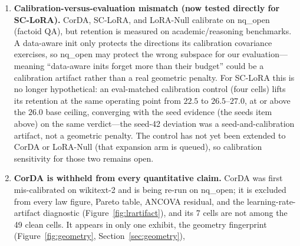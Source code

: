 \documentclass[11pt]{article}
\newcommand{\dw}{F_{\Delta}}
\begin{document}
\begin{enumerate}
        a plain-LoRA rank ladder at fixed lr\,3e-4 (r8${\to}$r16${\to}$r32)
        moves \emph{along} the curve rather than off it
        ($\dw\ 0.518\!\to\!0.603\!\to\!0.739$ with retention
        $24.0\!\to\!23.0\!\to\!22.2$): the rank effect vanishes once $\dw$ is
        controlled---rank buys magnitude, not retention. One disclosed anomaly:
        the rank-16 control's lr\,3e-4 sibling lands in a deterministic
        answer-format collapse basin---CS-8 $13.53$, below chance per-dataset,
        with retention fully \emph{intact} ($26.84$) and healthy training, and
        a dedicated re-evaluation reproduces it; it is not a magnitude effect
        ($\dw\!=\!0.328$), and its seed replicate is queued. The control is
        single-seed, and the weight-decay knob has still been given only to
        LoRA---so the remaining strong form of Claim~3 is the wd knob extended
        to every frontier arm.
  \item \textbf{Calibration-versus-evaluation mismatch (now tested directly for
        SC-LoRA).} CorDA, SC-LoRA, and LoRA-Null calibrate on nq\_open (factoid
        QA), but retention is measured on academic/reasoning benchmarks. A
        data-aware init only protects the directions its calibration covariance
        exercises, so nq\_open may protect the wrong subspace for our
        evaluation---meaning ``data-aware inits forget more than their budget''
        could be a calibration artifact rather than a real geometric penalty. For
        SC-LoRA this is no longer hypothetical: an eval-matched calibration
        control (four cells) lifts its retention at the same operating point from
        $22.5$ to $26.5$--$27.0$, at or above the $26.0$ base ceiling, converging
        with the seed evidence (the seeds item above) on the same verdict---the
        seed-42 deviation was a seed-and-calibration artifact, not a geometric
        penalty. The control has not yet been extended to CorDA or LoRA-Null
        (that expansion arm is queued), so calibration sensitivity for those two
        remains open.
  \item \textbf{CorDA is withheld from every quantitative claim.} CorDA was first
        mis-calibrated on wikitext-2 and is being re-run on nq\_open; it is excluded
        from every law figure, Pareto table, ANCOVA residual, and the
        learning-rate-artifact diagnostic (Figure~\ref{fig:lrartifact}), and its 7
        cells are not among the 49 clean cells. It appears in only one exhibit, the
        geometry fingerprint (Figure~\ref{fig:geometry}, Section~\ref{sec:geometry}),

\end{enumerate}
\end{document}
